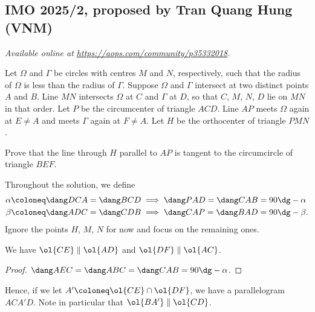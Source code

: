 \documentclass[11pt]{scrartcl}
\begin{document}
\subsection{IMO 2025/2, proposed by Tran Quang Hung (VNM)}
\textsl{Available online at \url{https://aops.com/community/p35332018}.}
\begin{mdframed}[style=mdpurplebox,frametitle={Problem statement}]
Let $\Omega$ and $\Gamma$ be circles with centres $M$ and $N$, respectively,
such that the radius of $\Omega$ is less than the radius of $\Gamma$.
Suppose $\Omega$ and $\Gamma$ intersect at two distinct points $A$ and $B$.
Line $MN$ intersects $\Omega$ at $C$ and $\Gamma$ at $D$,
so that $C$, $M$, $N$, $D$ lie on $MN$ in that order.
Let $P$ be the circumcenter of triangle $ACD$.
Line $AP$ meets $\Omega$ again at $E \neq A$ and meets $\Gamma$ again at $F \neq A$.
Let $H$ be the orthocenter of triangle $PMN$.

Prove that the line through $H$ parallel to $AP$ is tangent
to the circumcircle of triangle $BEF$.
\end{mdframed}
Throughout the solution, we define
\begin{align*}
  \alpha &\coloneq \dang DCA = \dang BCD \implies \dang PAD = \dang CAB = 90\dg - \alpha \\
  \beta &\coloneq \dang ADC = \dang CDB \implies \dang CAP = \dang BAD = 90\dg - \beta.
\end{align*}
Ignore the points $H$, $M$, $N$ for now and focus on the remaining ones.
\begin{claim*}
  We have $\ol{CE} \parallel \ol{AD}$ and $\ol{DF} \parallel \ol{AC}$.
\end{claim*}
\begin{proof}
  $\dang AEC = \dang ABC = \dang CAB = 90\dg - \alpha$.
\end{proof}
Hence, if we let $A' \coloneq \ol{CE} \cap \ol{DF}$, we have a parallelogram $ACA'D$.
Note in particular that $\ol{BA'} \parallel \ol{CD}$.
\end{document}

